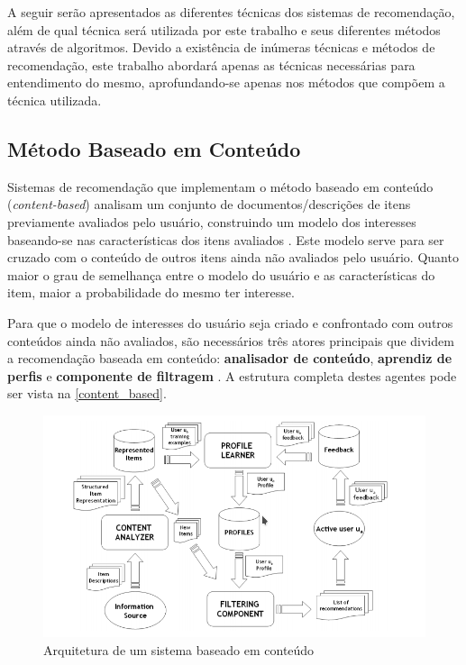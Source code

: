 \documentclass[12pt, openright, oneside, a4paper, brazil]{abntex2}
\begin{document}
A seguir serão apresentados as diferentes técnicas dos sistemas de recomendação, além de qual técnica será utilizada por este trabalho e seus diferentes métodos através de algoritmos. Devido a existência de inúmeras técnicas e métodos de recomendação, este trabalho abordará apenas as técnicas necessárias para entendimento do mesmo, aprofundando-se apenas nos métodos que compõem a técnica utilizada.

\subsection{Método Baseado em Conteúdo} \label{recs:content_based}

Sistemas de recomendação que implementam o método baseado em conteúdo (\textit{content-based}) analisam um conjunto de documentos/descrições de itens previamente avaliados pelo usuário, construindo um modelo dos interesses baseando-se nas características dos itens avaliados \cite{mladenic1999text, adomavicius2005toward, lops2011content}. Este modelo serve para ser cruzado com o conteúdo de outros itens ainda não avaliados pelo usuário. Quanto maior o grau de semelhança entre o modelo do usuário e as características do item, maior a probabilidade do mesmo ter interesse.

Para que o modelo de interesses do usuário seja criado e confrontado com outros conteúdos ainda não avaliados, são necessários três atores principais que dividem a recomendação baseada em conteúdo: \textbf{analisador de conteúdo}, \textbf{aprendiz de perfis} e \textbf{componente de filtragem} \cite{lops2011content}. A estrutura completa destes agentes pode ser vista na \autoref{content_based}.

\begin{figure}[h!tp]
	\caption{\label{content_based}Arquitetura de um sistema baseado em conteúdo}
	\begin{center}
		\includegraphics[scale=0.75]{images/content_based.png}
	\end{center}
\end{figure}
\end{document}
